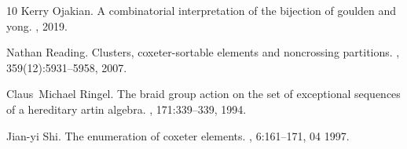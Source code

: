 \documentclass[11pt]{amsart}
\begin{document}
\begin{thebibliography}{10}
Kerry Ojakian.
\newblock A combinatorial interpretation of the bijection of goulden and yong.
, 2019.

Nathan Reading.
\newblock Clusters, coxeter-sortable elements and noncrossing partitions.
,
  359(12):5931--5958, 2007.

Claus~Michael Ringel.
\newblock The braid group action on the set of exceptional sequences of a
  hereditary artin algebra.
, 171:339--339, 1994.

Jian-yi Shi.
\newblock The enumeration of coxeter elements.
, 6:161--171, 04 1997.

\end{thebibliography}


%
%
\end{document}
